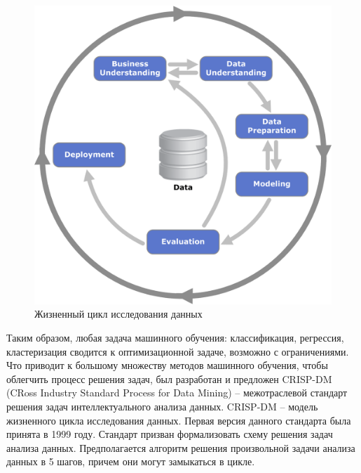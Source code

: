\begin{figure} 
    \vspace{-5ex}
    \includegraphics[width=\linewidth]{src/img/CRISP-DM_process_diagram.png}
    \caption{Жизненный цикл исследования данных \cite{wiki:crisp_dm}}
    \label{fig:crisp_dm}
\end{figure}

Таким образом, любая задача машинного обучения: классификация, регрессия, кластеризация сводится к оптимизационной задаче, возможно с ограничениями. Что приводит к большому множеству методов машинного обучения, чтобы облегчить процесс решения задач, был разработан и предложен CRISP-DM (CRoss Industry Standard Process for Data Mining) -- межотраслевой стандарт решения задач интеллектуального анализа данных. CRISP-DM -- модель жизненного цикла исследования данных.
Первая версия данного стандарта была принята в 1999 году. Стандарт призван формализовать схему решения задач анализа данных. Предполагается алгоритм решения произвольной задачи анализа данных в 5 шагов, причем они могут замыкаться в цикле.

